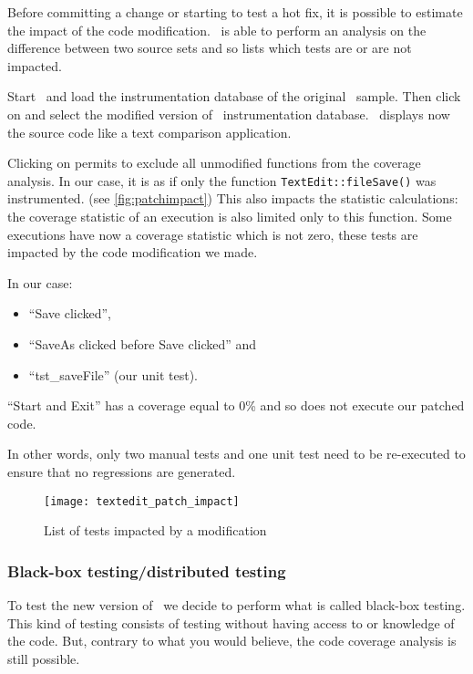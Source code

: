 Before committing a change or starting to test a hot fix, it is possible to
estimate the impact of the code modification. \CoverageBrowser\ is able
to perform an analysis on the difference between two source sets and so lists
which tests are or are not impacted.

Start \CoverageBrowser\ and load the instrumentation database of the  original
\TextEdit\ sample. Then click on  and
select the modified version of \TextEdit\ instrumentation database.
\CoverageBrowser\ displays  now the source code like a text comparison
application.

Clicking on  permits to exclude
all unmodified functions from the coverage analysis. In our case, it is as if
only the function \verb$TextEdit::fileSave()$ was instrumented. (see \autoref{fig:patchimpact})
This also impacts the statistic calculations: the coverage statistic of an
execution is also limited only to this function. Some executions have now a
coverage statistic which is not zero, these tests are impacted by the code
modification we made. 

In our case:
\begin{itemize}
  \item ``Save clicked'',
  \item ``SaveAs clicked before Save clicked'' and 
  \item ``tst\_saveFile'' (our unit test).
\end{itemize}

``Start and Exit'' has a coverage equal to 0\% and so does not execute our
patched code.

In other words, only two manual tests and one unit test need to be re-executed
to ensure that no regressions are generated.

\begin{figure}[H]
  \begin{center}
    \texttt{[image: textedit\_patch\_impact]}
  \end{center}
  \caption{List of tests impacted by a modification}
  \label{fig:patchimpact}
\end{figure}

\subsubsection{Black-box testing/distributed testing}

To test the new version of \TextEdit\ we decide to perform what is called  black-box testing.
This kind of testing consists of testing without having access to or knowledge of the code. But, contrary to what you would believe,
the code coverage analysis is still possible. 

